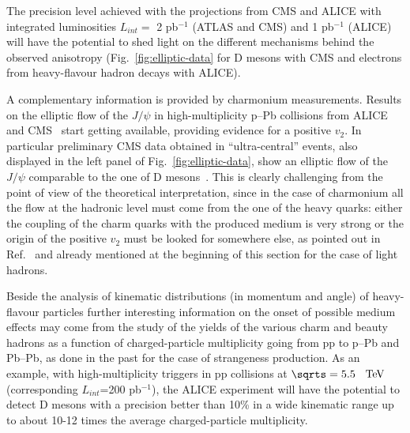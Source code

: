 The precision level achieved with the projections from CMS and ALICE with integrated luminosities $L_{int}=$ 2 pb$^{-1}$ (ATLAS and CMS) and 1 pb$^{-1}$ (ALICE) will have the potential to shed light on the different mechanisms behind the observed anisotropy (Fig.~\ref{fig:elliptic-data} for D mesons with CMS and electrons from heavy-flavour hadron decays with ALICE).

A complementary information is provided by charmonium measurements. Results on the elliptic flow of the $J/\psi$ in high-multiplicity p--Pb collisions from ALICE~\cite{Acharya:2017tfn} and CMS~\cite{CMS:2018xac} start getting available, providing evidence for a positive $v_2$. In particular preliminary CMS data obtained in ``ultra-central'' events, also displayed in the left panel of Fig.~\ref{fig:elliptic-data},  show an elliptic flow of the $J/\psi$ comparable to the one of D mesons~\cite{CMS:2018xac}. This is clearly challenging from the point of view of the theoretical interpretation, since in the case of charmonium all the flow at the hadronic level must come from the one of the heavy quarks: either the coupling of the charm quarks with the produced medium is very strong or the origin of the positive $v_2$ must be looked for somewhere else, as pointed out in Ref.~\cite{Du:2018wsj} and already mentioned at the beginning of this section for the case of light hadrons.

Beside the analysis of kinematic distributions (in momentum and angle) of heavy-flavour particles further interesting information on the onset of possible medium effects may come from the study of the yields of the various charm and beauty hadrons as a function of charged-particle multiplicity going from pp to p--Pb and Pb--Pb, as done in the past for the case of strangeness production. As an example, with high-multiplicity triggers in pp collisions at $\sqrts =5.5$~$~\text{TeV}$ (corresponding $L_{int}$=200 pb$^{-1}$), the ALICE experiment will have the potential to detect D mesons with a precision better than 10\% in a wide kinematic range up to about 10-12 times the average charged-particle multiplicity. 





